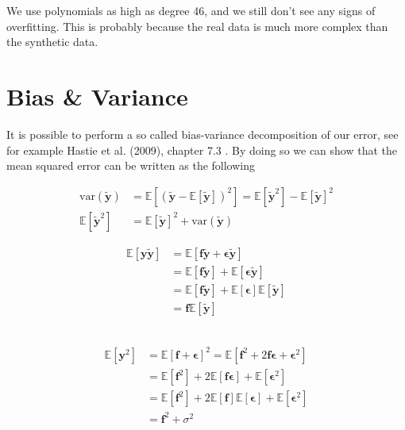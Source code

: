 \documentclass[twoside,11pt]{report}
\begin{document}
We use polynomials as high as degree 46, and we still don't see any signs of overfitting. 
This is probably because the real data is much more complex than the synthetic data.

\section{Bias \& Variance}
\label{sec:biasvariance}

It is possible to perform a so called bias-variance decomposition of our error, 
see for example Hastie et al. (2009), chapter 7.3 \cite{hastie01statisticallearning}.
By doing so we can show that the mean squared error can be written as the following

\begin{minipage}[t]{.48\linewidth}
\begin{align*}
    \text{var}(\mathbf{\tilde{y}}) &= \mathbb{E}\left[\left(\tilde{\mathbf{y}}-\mathbb{E}\left[\mathbf{\tilde{y}}\right]\right)^2\right] 
         = \mathbb{E}[\mathbf{\tilde{y}}^2] - \mathbb{E}[\mathbf{\tilde{y}}]^2\\
    \mathbb{E}[\mathbf{\tilde{y}}^2] &= \mathbb{E}[\mathbf{\tilde{y}}]^2 + \text{var}(\mathbf{\tilde{y}})
\end{align*}
\end{minipage}
\hspace{2mm}
\begin{minipage}[t]{.45\linewidth}
\begin{align*}
    \mathbb{E}[\mathbf{y\tilde{y}}] & = \mathbb{E}[\mathbf{f\tilde{y}} + \mathbf{\epsilon\tilde{y}}]\\
& = \mathbb{E}[\mathbf{f\tilde{y}}] + \mathbb{E}[\mathbf{\epsilon\tilde{y}}]\\
& = \mathbb{E}[\mathbf{f\tilde{y}}] + \mathbb{E}[\mathbf{\epsilon}]\mathbb{E}[\mathbf{\tilde{y}}]\\
& = \mathbf{f}\mathbb{E}[\mathbf{\tilde{y}}]
\end{align*}
\end{minipage}\\
\begin{align*}
\mathbb{E}[\mathbf{y}^2] & = \mathbb{E}[\mathbf{f} + \mathbf{\epsilon}]^2 = \mathbb{E}[\mathbf{f}^2 + 2\mathbf{f}\mathbf{\epsilon} + \mathbf{\epsilon}^2]\\
& = \mathbb{E}[\mathbf{f}^2] + 2\mathbb{E}[\mathbf{f}\mathbf{\epsilon}] + \mathbb{E}[\mathbf{\epsilon}^2]\\
& = \mathbb{E}[\mathbf{f}^2] + 2\mathbb{E}[\mathbf{f}]\mathbb{E}[\mathbf{\epsilon}] + \mathbb{E}[\mathbf{\epsilon}^2]\\
& = \mathbf{f}^2 + \sigma^2
\end{align*}
\end{document}
